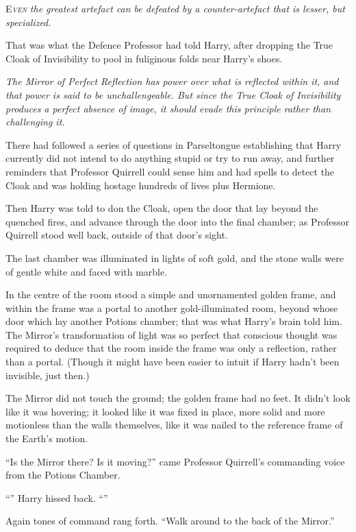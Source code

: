 
\lettrine{E}{\emph{ven}} \emph{the greatest artefact can be defeated by a counter-artefact that is lesser, but specialized.}

That was what the Defence Professor had told Harry, after dropping the True Cloak of Invisibility to pool in fuliginous folds near Harry’s shoes.

\emph{The Mirror of Perfect Reflection has power over what is reflected within it, and that power is said to be unchallengeable. But since the True Cloak of Invisibility produces a perfect absence of image, it should evade this principle rather than challenging it.}

There had followed a series of questions in Parseltongue establishing that Harry currently did not intend to do anything stupid or try to run away, and further reminders that Professor Quirrell could sense him and had spells to detect the Cloak and was holding hostage hundreds of lives plus Hermione.

Then Harry was told to don the Cloak, open the door that lay beyond the quenched fires, and advance through the door into the final chamber; as Professor Quirrell stood well back, outside of that door’s sight.

The last chamber was illuminated in lights of soft gold, and the stone walls were of gentle white and faced with marble.

In the centre of the room stood a simple and unornamented golden frame, and within the frame was a portal to another gold-illuminated room, beyond whose door which lay another Potions chamber; that was what Harry’s brain told him. The Mirror’s transformation of light was so perfect that conscious thought was required to deduce that the room inside the frame was only a reflection, rather than a portal. (Though it might have been easier to intuit if Harry hadn’t been invisible, just then.)

The Mirror did not touch the ground; the golden frame had no feet. It didn’t look like it was hovering; it looked like it was fixed in place, more solid and more motionless than the walls themselves, like it was nailed to the reference frame of the Earth’s motion.

“Is the Mirror there? Is it moving?” came Professor Quirrell’s commanding voice from the Potions Chamber.

“” Harry hissed back. “”

Again tones of command rang forth. “Walk around to the back of the Mirror.”

